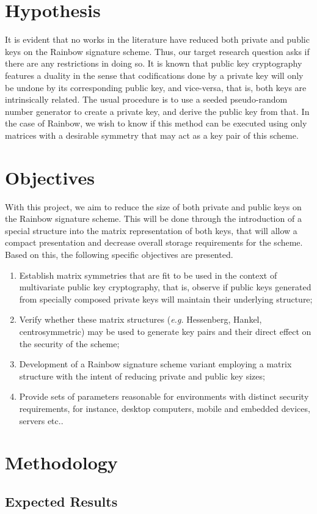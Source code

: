 \documentclass[10pt]{article}
\begin{document}
\section{Hypothesis}

It is evident that no works in the literature have reduced both private and public keys on the Rainbow signature scheme. Thus, our target research question asks if there are any restrictions in doing so. It is known that public key cryptography features a duality in the sense that codifications done by a private key will only be undone by its corresponding public key, and vice-versa, that is, both keys are intrinsically related. The usual procedure is to use a seeded pseudo-random number generator to create a private key, and derive the public key from that. In the case of Rainbow, we wish to know if this method can be executed using only matrices with a desirable symmetry that may act as a key pair of this scheme. 

\section{Objectives}

With this project, we aim to reduce the size of both private and public keys on the Rainbow signature scheme. This will be done through the introduction of a special structure into the matrix representation of both keys, that will allow a compact presentation and decrease overall storage requirements for the scheme. Based on this, the following specific objectives are presented.

\begin{enumerate}[label=(\alph*)]
    \item Establish matrix symmetries that are fit to be used in the context of multivariate public key cryptography, that is, observe if public keys generated from specially composed private keys will maintain their underlying structure;
    \item Verify whether these matrix structures (\emph{e.g.} Hessenberg, Hankel, centrosymmetric) may be used to generate key pairs and their direct effect on the security of the scheme;
    \item Development of a Rainbow signature scheme variant employing a matrix structure with the intent of reducing private and public key sizes;
    \item Provide sets of parameters reasonable for environments with distinct security requirements, for instance, desktop computers, mobile and embedded devices, servers etc..
\end{enumerate}

\section{Methodology}

\subsection{Expected Results}



\end{document}

